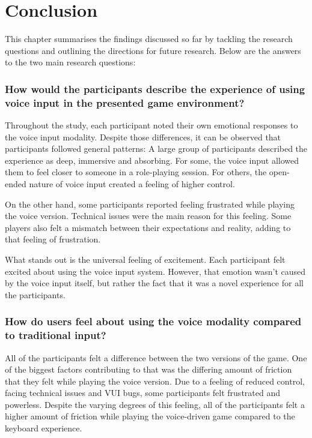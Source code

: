 \chapter{Conclusion}

\label{ch:conclusion}



This chapter summarises the findings discussed so far by tackling the research questions and outlining the directions for future research. 
Below are the answers to the two main research questions:

\subsection{How would the participants describe the experience of using voice input in the presented game environment?}


Throughout the study, each participant noted their own emotional responses to the voice input modality. 
Despite those differences, it can be observed that participants followed general patterns:
A large group of participants described the experience as deep, immersive and absorbing.
For some, the voice input allowed them to feel closer to someone in a role-playing session. For others, the open-ended nature of voice input created a feeling of higher control.

On the other hand, some participants reported feeling frustrated while playing the voice version.
Technical issues were the main reason for this feeling. Some players also felt a mismatch between their expectations and reality, adding to that feeling of frustration.


What stands out is the universal feeling of excitement. Each participant felt excited about using the voice input system. However, that emotion wasn't caused by the voice input itself, but rather the fact that it was a novel experience for all the participants.

\subsection{How do users feel about using the voice modality compared to traditional input?}

All of the participants felt a difference between the two versions of the game.
One of the biggest factors contributing to that was the differing amount of friction that they felt while playing the voice version.
Due to a feeling of reduced control, facing technical issues and VUI bugs, some participants felt frustrated and powerless. 
Despite the varying degrees of this feeling, all of the participants felt a higher amount of friction while playing the voice-driven game compared to the keyboard experience. 






